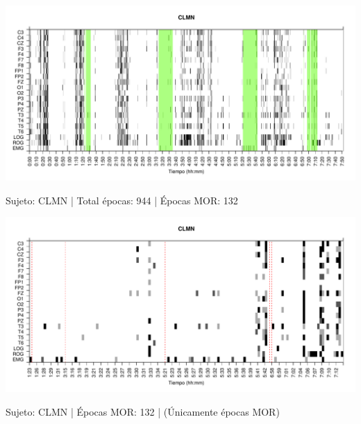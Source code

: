 \begin{SidewaysFigure}
\centering
\includegraphics[width=\linewidth]
{./material_bonito170220/CLMN10SUE_132_mor132_tot944_est_total.pdf} 
\caption{Sujeto: CLMN | Total \'epocas: 944 | \'Epocas MOR: 132}
\end{SidewaysFigure}
\begin{SidewaysFigure}
\centering
\includegraphics[width=\linewidth]
{./material_bonito170220/CLMN10SUE_132_mor132_tot132_est_mor.pdf} 
\caption{Sujeto: CLMN | \'Epocas MOR: 132 | (\'Unicamente \'epocas MOR)}
\end{SidewaysFigure}


